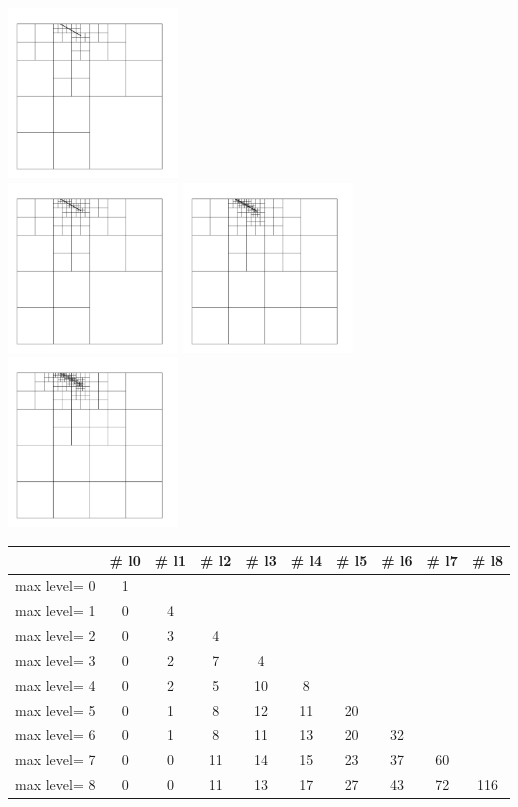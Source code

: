 \includegraphics[width=4.5cm]{images/meshes/AMR/amr5}\\
\includegraphics[width=4.5cm]{images/meshes/AMR/amr6}
\includegraphics[width=4.5cm]{images/meshes/AMR/amr7}
\includegraphics[width=4.5cm]{images/meshes/AMR/amr8}

\begin{tabular}{l|ccccccccc}
             & \# l0  & \# l1 & \# l2 & \# l3 & \# l4 & \# l5 & \# l6 & \# l7 & \# l8 \\ 
\hline\hline
max level= 0 & 1 & \\
max level= 1 & 0 & 4 & \\
max level= 2 & 0 & 3 & 4 \\
max level= 3 & 0 & 2 & 7 & 4\\
max level= 4 & 0 & 2 & 5 & 10 & 8 \\
max level= 5 & 0 & 1 & 8 & 12 & 11 & 20 \\ 
max level= 6 & 0 & 1 & 8 & 11 & 13 & 20 & 32 \\
max level= 7 & 0 & 0 & 11 & 14 & 15 & 23 & 37 & 60 \\
max level= 8 & 0 & 0 & 11 & 13 & 17 & 27 & 43 & 72 & 116 \\
\hline
\end{tabular}


